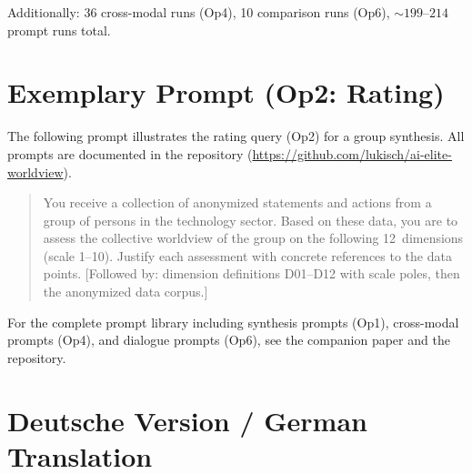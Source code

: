 \documentclass[12pt,a4paper]{article}
\begin{document}
Additionally: 36 cross-modal runs (Op4), 10 comparison runs (Op6), ${\sim}199$--$214$ prompt runs total.


\section{Exemplary Prompt (Op2: Rating)}
\label{app:prompt}

The following prompt illustrates the rating query (Op2) for a group synthesis. All prompts are documented in the repository (\url{https://github.com/lukisch/ai-elite-worldview}).

\begin{quote}
\small\ttfamily
You receive a collection of anonymized statements and actions from a group of persons in the technology sector. Based on these data, you are to assess the collective worldview of the group on the following 12~dimensions (scale 1--10). Justify each assessment with concrete references to the data points. [Followed by: dimension definitions D01--D12 with scale poles, then the anonymized data corpus.]
\end{quote}

\noindent For the complete prompt library including synthesis prompts (Op1), cross-modal prompts (Op4), and dialogue prompts (Op6), see the companion paper \citep{Geiger2026SWR} and the repository.


\section*{Deutsche Version / German Translation}



\maketitle
\thispagestyle{empty}
\end{document}

